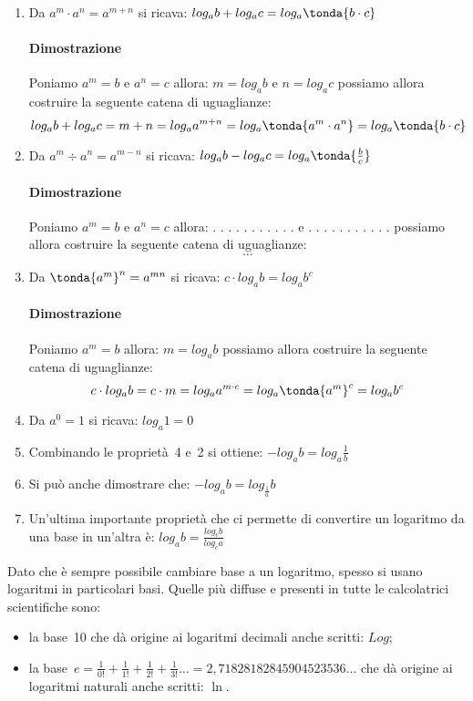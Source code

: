 \begin{enumerate} 
 \item Da \quad \(a^m \cdot a^n = a^{m+n}\) \quad si ricava: \quad
 \(log_a {b} + log_a {c} = log_a \tonda{b \cdot c} \)
\paragraph{Dimostrazione} 
Poniamo \(a^m = b\) e \(a^n = c\) 
allora: \(m = log_a {b}\) e \(n = log_a {c}\) possiamo allora costruire la 
seguente catena di uguaglianze:
\[log_a {b} + log_a {c} =
m + n =  
log_a {a^{m + n}} =
log_a \tonda{{a^m \cdot a^n}}  =
log_a \tonda{{b \cdot c}}\]
 \item Da \quad \(a^m \div a^n = a^{m-n}\) \quad si ricava: \quad
 \(log_a {b} - log_a {c} = log_a \tonda{\frac{b}{c}}\)
\paragraph{Dimostrazione} 
Poniamo \(a^m = b\) e \(a^n = c\) 
allora: . . . . . . . . . . . e . . . . . . . . . . . 
possiamo allora costruire la seguente catena di uguaglianze:
\[\dots\]
 \item Da \quad \(\tonda{a^m}^n = a^{mn}\) \quad si ricava: \quad
 \(c \cdot log_a {b} = log_a {b^c} \)
\paragraph{Dimostrazione} 
Poniamo \(a^m = b\)  
allora: \(m = log_a {b}\) possiamo allora costruire la 
seguente catena di uguaglianze:
\[c \cdot log_a {b} =
c \cdot m = 
log_a {a^{m \cdot c}} =
log_a {\tonda{a^{m}}^c} = 
log_a {b^c}\]
 \item Da \quad \(a^0 = 1\) \quad si ricava: \quad
 \(log_a {1} = 0\)
 \item Combinando le proprietà~4 e~2 si ottiene: \quad
 \(-log_a {b} = log_a {\frac{1}{b}}\)
 \item Si può anche dimostrare che: \quad
 \(-log_a {b} = log_{\frac{1}{a}} b\)
 \item Un'ultima importante proprietà che ci permette di convertire un 
logaritmo da una base in un'altra è: \quad
 \(log_a {b} = \frac{log_c b}{log_c a}\)
\end{enumerate}

\noindent
Dato che è sempre possibile cambiare base a un logaritmo, spesso si 
usano logaritmi in particolari basi. Quelle più diffuse e presenti in tutte le 
calcolatrici scientifiche sono: 
\begin{itemize}
 \item 
la base~10 che dà origine ai logaritmi decimali anche scritti: \(Log\);
 \item 
la base~\(e = \frac{1}{0!} + \frac{1}{1!} + \frac{1}{2!} + \frac{1}{3!} \dots = 
2,71828 18284 59045 23536\dots \) che dà origine ai logaritmi naturali anche 
scritti: \(\ln\).
\end{itemize}

